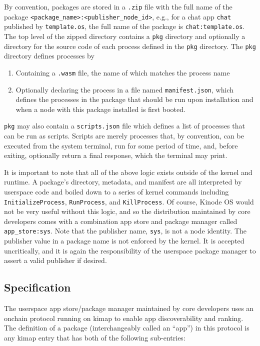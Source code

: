 \documentclass[runningheads]{llncs}
\begin{document}
By convention, packages are stored in a \verb|.zip| file with the full name of the package \verb|<package_name>:<publisher_node_id>|, e.g., for a chat app \verb|chat| published by \verb|template.os|, the full name of the package is \verb|chat:template.os|.
The top level of the zipped directory contains a \verb|pkg| directory and optionally a directory for the source code of each process defined in the \verb|pkg| directory.
The \verb|pkg| directory defines processes by
\begin{enumerate}
    \item Containing a \verb|.wasm| file, the name of which matches the process name
    \item Optionally declaring the process in a file named \verb|manifest.json|, which defines the processes in the package that should be run upon installation and when a node with this package installed is first booted.
\end{enumerate}

\verb|pkg| may also contain a \verb|scripts.json| file which defines a list of processes that can be run as scripts.
Scripts are merely processes that, by convention, can be executed from the system terminal, run for some period of time, and, before exiting, optionally return a final response, which the terminal may print.

It is important to note that all of the above logic exists outside of the kernel and runtime.
A package's directory, metadata, and manifest are all interpreted by userspace code and boiled down to a series of kernel commands including \verb|InitializeProcess|, \verb|RunProcess|, and \verb|KillProcess|.
Of course, Kinode OS would not be very useful without this logic, and so the distribution maintained by core developers comes with a combination app store and package manager called \verb|app_store:sys|.
Note that the publisher name, \verb|sys|, is not a node identity.
The publisher value in a package name is not enforced by the kernel.
It is accepted uncritically, and it is again the responsibility of the userspace package manager to assert a valid publisher if desired.

\subsection{Specification}
\label{sec:packagemanagerspec}

The userspace app store/package manager maintained by core developers uses an onchain protocol running on kimap to enable app discoverability and ranking.
The definition of a package (interchangeably called an ``app'') in this protocol is any kimap entry that has both of the following sub-entries:
\end{document}
